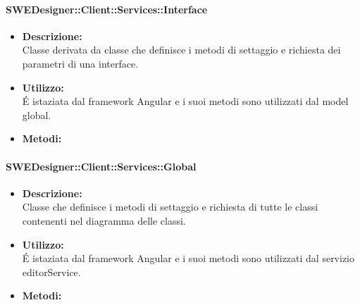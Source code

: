           	\paragraph{SWEDesigner::Client::Services::Interface}
				\begin{itemize}
          			\item \textbf{Descrizione:}\\
          			Classe derivata da classe che definisce i metodi di settaggio e richiesta dei parametri di una interface.
          			\item \textbf{Utilizzo:}\\
          			É istaziata dal framework Angular e i suoi metodi sono utilizzati dal model global.
          			\item \textbf{Metodi:}\\
          		\end{itemize}
          	\paragraph{SWEDesigner::Client::Services::Global}
				\begin{itemize}
          			\item \textbf{Descrizione:}\\
          			Classe che definisce i metodi di settaggio e richiesta di tutte le classi contenenti nel diagramma delle classi.
          			\item \textbf{Utilizzo:}\\
          			É istaziata dal framework Angular e i suoi metodi sono utilizzati dal servizio editorService.
          			\item \textbf{Metodi:}\\
          		\end{itemize}